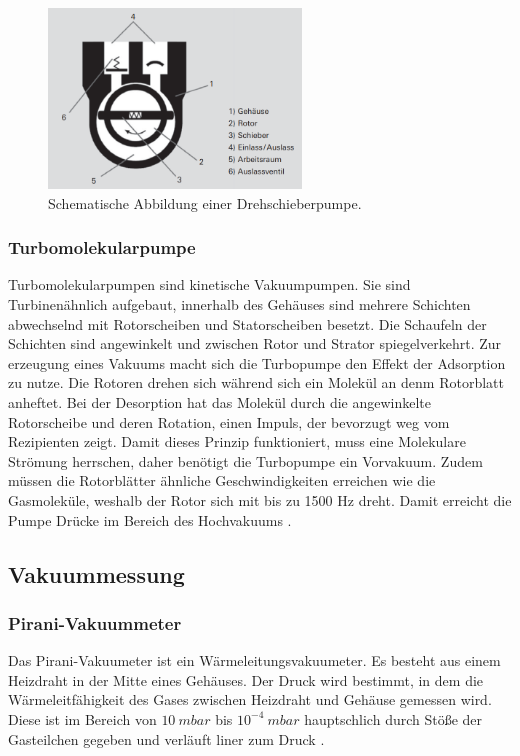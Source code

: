     \begin{figure}
        \centering
        \label{fig:Drehschieberpumpe}
        \includegraphics[width=0.6\textwidth]{Drehschieberpumpe.png}
        \caption{Schematische Abbildung einer Drehschieberpumpe.}
    \end{figure}

\subsubsection{Turbomolekularpumpe}
Turbomolekularpumpen sind kinetische Vakuumpumpen.
Sie sind Turbinenähnlich aufgebaut, innerhalb des Gehäuses sind mehrere Schichten abwechselnd mit Rotorscheiben und Statorscheiben besetzt.
Die Schaufeln der Schichten sind angewinkelt und zwischen Rotor und Strator spiegelverkehrt. 
Zur erzeugung eines Vakuums macht sich die Turbopumpe den Effekt der Adsorption zu nutze. Die Rotoren drehen sich während sich ein Molekül an denm Rotorblatt 
anheftet. Bei der Desorption hat das Molekül durch die angewinkelte Rotorscheibe und deren Rotation, einen Impuls, der bevorzugt weg vom Rezipienten zeigt.
Damit dieses Prinzip funktioniert, muss eine Molekulare Strömung herrschen, daher benötigt die Turbopumpe ein Vorvakuum. Zudem müssen die Rotorblätter ähnliche Geschwindigkeiten 
erreichen wie die Gasmoleküle, weshalb der Rotor sich mit bis zu 1500 Hz dreht.
Damit erreicht die Pumpe Drücke im Bereich des Hochvakuums \cite{Pfeiffer, S.83,84}.


\subsection{Vakuummessung}
\subsubsection{Pirani-Vakuummeter}
Das Pirani-Vakuumeter ist ein Wärmeleitungsvakuumeter. Es besteht aus einem Heizdraht in der Mitte eines Gehäuses.
Der Druck wird bestimmt, in dem die Wärmeleitfähigkeit des Gases zwischen Heizdraht und Gehäuse gemessen wird. 
Diese ist im Bereich von $10\: mbar$ bis $10^{-4}\: mbar$ hauptschlich durch Stöße der Gasteilchen gegeben und verläuft liner zum Druck \cite{Pfeiffer, S.93,94}.


